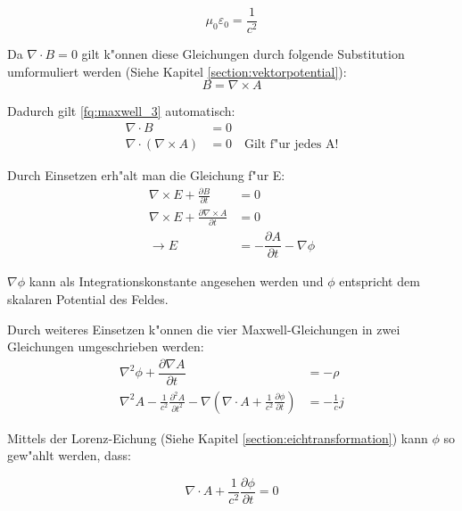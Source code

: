 \begin{equation*}
\mu_0\varepsilon_0=\frac{1}{c^2}
\end{equation*}

Da $\nabla \cdot B = 0 $ gilt k"onnen diese Gleichungen durch folgende Substitution umformuliert werden (Siehe Kapitel \ref{section:vektorpotential}):
\begin{equation*}
B = \nabla\times A 
\end{equation*}

Dadurch gilt \ref{fq:maxwell_3} automatisch:
\begin{equation*}
\begin{split}
\nabla \cdot B &= 0 \\
\nabla \cdot ( \nabla\times A ) &= 0 \quad \text{Gilt f"ur jedes A!}
\end{split}
\end{equation*}

Durch Einsetzen erh"alt man die Gleichung f"ur E:
\begin{equation*}
\begin{split}
\nabla\times E + \frac{\partial B }{\partial t} &= 0 \\
\nabla\times E + \frac{\partial \nabla\times A }{\partial t} &= 0 \\
\rightarrow E &= -\dfrac{\partial A}{\partial t} - \nabla \phi
\end{split}
\end{equation*}

$\nabla \phi$ kann als Integrationskonstante angesehen werden und $\phi$ entspricht dem skalaren Potential des Feldes.

Durch weiteres Einsetzen k"onnen die vier Maxwell-Gleichungen in zwei Gleichungen umgeschrieben werden:
\begin{align} 
 \label{fq:a_coupled_a}
 \nabla^2 \phi + \dfrac{\partial \nabla A}{\partial t} &= -\rho \\
 \label{fq:a_coupled_b}
 \nabla^2 A - \frac{1}{c^2} \frac{\partial^2 A }{\partial t^2} - \nabla \left( \nabla \cdot A + \frac{1}{c^2} \frac{\partial \phi }{\partial t} \right) &= - \frac{1}{c} j
\end{align}

Mittels der Lorenz-Eichung (Siehe Kapitel \ref{section:eichtransformation}) kann $\phi$ so gew"ahlt werden, dass:

\begin{equation} \label{fq:lorenz_eq}
\nabla \cdot A + \frac{1}{c^2} \frac{\partial \phi }{\partial t} = 0
\end{equation}

